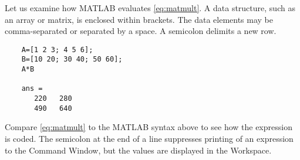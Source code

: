 Let us examine how MATLAB evaluates \eqref{eq:matmult}. A data structure, such as an array or matrix, is enclosed within brackets. The data elements may be comma-separated or separated by a space. A semicolon delimits a new row.
\begin{verbatim}
    A=[1 2 3; 4 5 6];
    B=[10 20; 30 40; 50 60];
    A*B

    ans =
       220   280
       490   640
\end{verbatim}
Compare \eqref{eq:matmult} to the MATLAB syntax above to see how the expression is coded. The semicolon at the end of a line suppresses printing of an expression to the Command Window, but the values are displayed in the Workspace.
